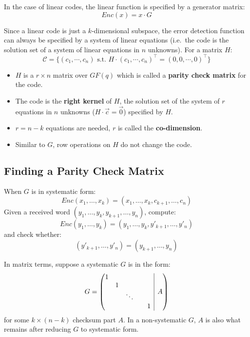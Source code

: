 \documentclass[11pt]{article}
\begin{document}
In the case of linear codes, the linear function is specified by a generator matrix: 
\[
  Enc(x) = x \cdot G
\]

Since a linear code is just a $k$-dimensional subspace, the error detection function can always be specified by a system of linear equations (i.e.\ the code is the solution set of a system of linear equations in $n$ unknowns).
For a matrix $H$:
\[
  \mathcal{C} = \{ (c_1, \cdots, c_n) \text{ s.t.\ } H \cdot (c_1, \cdots, c_n)^\intercal = (0, 0, \cdots, 0)^\intercal \}
\]

\begin{itemize}
  \item $H$ is a $r \times n$ matrix over $GF(q)$ which is called a \textbf{parity check matrix} for the code.
  \item The code is the \textbf{right kernel} of $H$, the solution set of the system of $r$ equations in $n$ unknowns ($H \cdot \overrightarrow{c} = \overrightarrow{0}$) specified by $H$.
  \item $r = n - k$ equations are needed, $r$ is called the \textbf{co-dimension}.
  \item Similar to $G$, row operations on $H$ do not change the code.
\end{itemize}

\subsection{Finding a Parity Check Matrix}
When $G$ is in systematic form:
\[
  Enc(x_1, \ldots, x_k) = (x_1, \ldots, x_k, c_{k + 1}, \ldots, c_n)
\]
Given a received word $(y_1, \ldots, y_k, y_{k + 1}, \ldots, y_n)$, compute:
\[
	Enc(y_1, \ldots, y_k) = (y_1, \ldots, y_k, y'_{k + 1}, \ldots, y'_n)
\]
and check whether:
\[
	(y'_{k + 1}, \ldots, y'_n) =  (y_{k + 1}, \ldots, y_n)
\]

In matrix terms, suppose a systematic $G$ is in the form:
\[
  G = 
  \left( \begin{array}{@{}c|c@{}}
     \begin{matrix}
        1 & & & \\
        & 1 & & \\
        & & \ddots & \\
        & & & & 1
     \end{matrix} 
        & A
  \end{array} \right)
\]
for some $k \times (n - k)$ checksum part $A$.
In a non-systematic $G$, $A$ is also what remains after reducing $G$ to systematic form.
\end{document}

